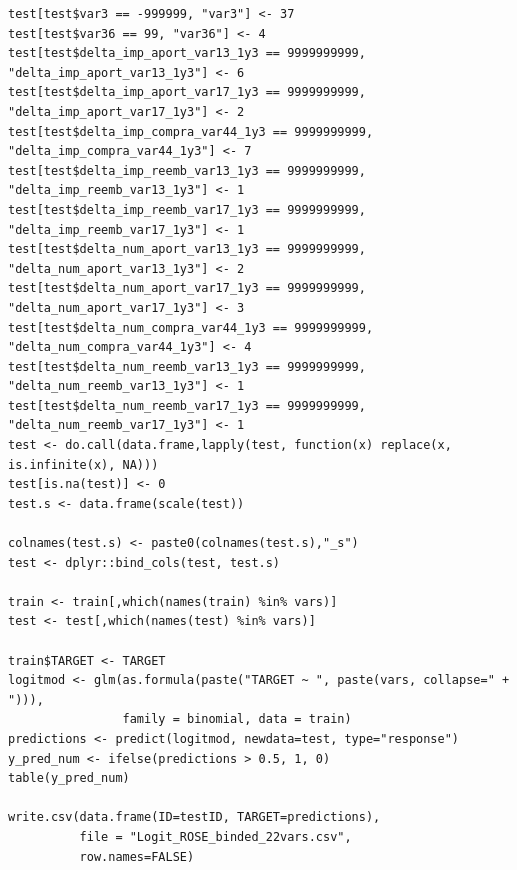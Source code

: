 \documentclass[11pt,a4paper,spanish]{article} %
\begin{document}
{\begin{verbatim}
test[test$var3 == -999999, "var3"] <- 37
test[test$var36 == 99, "var36"] <- 4
test[test$delta_imp_aport_var13_1y3 == 9999999999, "delta_imp_aport_var13_1y3"] <- 6
test[test$delta_imp_aport_var17_1y3 == 9999999999, "delta_imp_aport_var17_1y3"] <- 2
test[test$delta_imp_compra_var44_1y3 == 9999999999, "delta_imp_compra_var44_1y3"] <- 7
test[test$delta_imp_reemb_var13_1y3 == 9999999999, "delta_imp_reemb_var13_1y3"] <- 1
test[test$delta_imp_reemb_var17_1y3 == 9999999999, "delta_imp_reemb_var17_1y3"] <- 1
test[test$delta_num_aport_var13_1y3 == 9999999999, "delta_num_aport_var13_1y3"] <- 2
test[test$delta_num_aport_var17_1y3 == 9999999999, "delta_num_aport_var17_1y3"] <- 3
test[test$delta_num_compra_var44_1y3 == 9999999999, "delta_num_compra_var44_1y3"] <- 4
test[test$delta_num_reemb_var13_1y3 == 9999999999, "delta_num_reemb_var13_1y3"] <- 1
test[test$delta_num_reemb_var17_1y3 == 9999999999, "delta_num_reemb_var17_1y3"] <- 1
test <- do.call(data.frame,lapply(test, function(x) replace(x, is.infinite(x), NA)))
test[is.na(test)] <- 0
test.s <- data.frame(scale(test))

colnames(test.s) <- paste0(colnames(test.s),"_s")
test <- dplyr::bind_cols(test, test.s)

train <- train[,which(names(train) %in% vars)]
test <- test[,which(names(test) %in% vars)]

train$TARGET <- TARGET
logitmod <- glm(as.formula(paste("TARGET ~ ", paste(vars, collapse=" + "))), 
                family = binomial, data = train)
predictions <- predict(logitmod, newdata=test, type="response") 
y_pred_num <- ifelse(predictions > 0.5, 1, 0)
table(y_pred_num)

write.csv(data.frame(ID=testID, TARGET=predictions), 
          file = "Logit_ROSE_binded_22vars.csv",
          row.names=FALSE)
\end{verbatim}
}

\newpage
\end{document}
